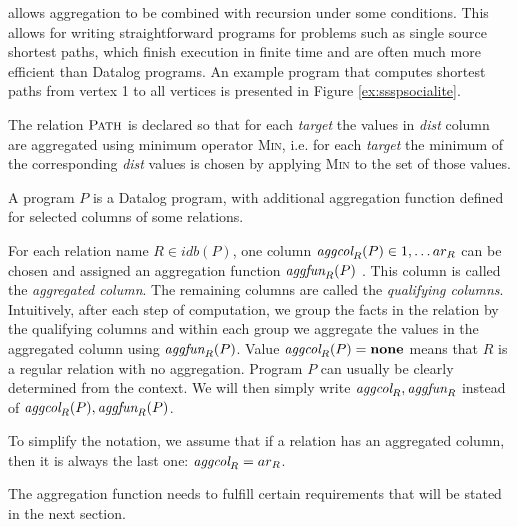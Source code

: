 \datalogra allows aggregation to be combined with recursion under some conditions. This allows for writing straightforward programs for problems such as single source shortest paths, which finish execution in finite time and are often much more efficient than Datalog programs. An example \datalogra program that computes shortest paths from vertex 1 to all vertices is presented in Figure \ref{ex:ssspsocialite}.



The relation $\textsc{Path}$ is declared so that for each \textit{target} the values in \textit{dist} column are aggregated using minimum operator \textsc{Min}, i.e. for each \textit{target} the minimum of the corresponding \textit{dist} values is chosen by applying \textsc{Min} to the set of those values.

A \datalogra program $P$ is a Datalog program, with additional aggregation function defined for selected columns of some relations. 

For each relation name $R \in idb(P)$, one column $\textit{aggcol}_R(P) \in {1, \dots ar_R}$ can be chosen and assigned an aggregation function $\textit{aggfun}_R(P)$ . This column is called the \emph{aggregated column}. The remaining columns are called the \emph{qualifying columns}. Intuitively, after each step of computation, we group the facts in the relation by the qualifying columns and within each group we aggregate the values in the aggregated column using $\textit{aggfun}_R(P)$. Value $\textit{aggcol}_R(P) = \bf{none}$ means that $R$ is a regular relation with no aggregation. Program $P$ can usually be clearly determined from the context. We will then simply write $\textit{aggcol}_R, \textit{aggfun}_R$ instead of $\textit{aggcol}_R(P), \textit{aggfun}_R(P)$.

To simplify the notation, we assume that if a relation has an aggregated column, then it is always the last one: $\textit{aggcol}_R = ar_R$.

The aggregation function needs to fulfill certain requirements that will be stated in the next section.

